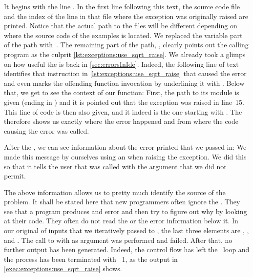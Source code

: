 It begins with the line .
In the first line following this text, the source code file and the index of the line in that file where the exception was originally raised are printed.
Notice that the actual path to the files will be different depending on where the source code of the examples is located.
We replaced the variable part of the path with~\inQuotes{\{\dots\}}.
The remaining part of the path, , clearly points out the calling program as the culprit \cref{lst:exceptions:use_sqrt_raise}.
We already took a glimps on how useful the  is back in \cref{sec:errorsInIde}.
Indeed, the following line of text identifies that instruction in \cref{lst:exceptions:use_sqrt_raise} that caused the error and even marks the offending function invocation by underlining it with \textil{{^}{^}{^}{^}{^}{^}{^}{^}{^}{^}{^}{^}}.
Below that, we get to see the context of our  function:
First, the path to its module is given (ending in ) and it is pointed out that the exception was raised in line~15.
This line of code is then also given, and it indeed is the one starting with .
The  therefore shows us exactly where the error happened and from where the code causing the error was called.%
%
\begin{sloppypar}%
After the , we can see information about the error printed that we passed in:
We made this message by ourselves using an  when raising the exception.
We did this so that it tells the user that  was called with the argument  that we did not permit.%
\end{sloppypar}%
%
The above information allows us to pretty much identify the source of the problem.
It shall be stated here that new programmers often ignore the .
They see that a program produces and error and then try to figure out why by looking at their code.
They often do not read the  or the error information below it.%
%
%
%
In our original  of inputs that we iteratively passed to , the last three elements are , , and .
The call to  with  as argument was performed and failed.
After that, no further output has been generated.
Indeed, the control flow has left the ~loop and the process has been terminated with ~1, as the output in \cref{exec:exceptions:use_sqrt_raise} shows.

